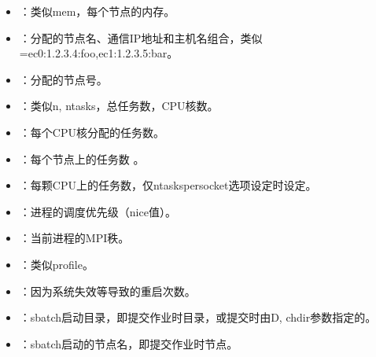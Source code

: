 \documentclass[a4paper,12pt,english]{sphinxmanual}
\begin{document}
\begin{itemize}
\item {} 
\sphinxAtStartPar
{}：类似\sphinxhyphen{}\sphinxhyphen{}mem，每个节点的内存。

\item {} 
\sphinxAtStartPar
{}：分配的节点名、通信IP地址和主机名组合，类似 =ec0:1.2.3.4:foo,ec1:1.2.3.5:bar。

\item {} 
\sphinxAtStartPar
{}：分配的节点号。

\item {} 
\sphinxAtStartPar
{}：类似\sphinxhyphen{}n, \sphinxhyphen{}\sphinxhyphen{}ntasks，总任务数，CPU核数。

\item {} 
\sphinxAtStartPar
{}：每个CPU核分配的任务数。

\item {} 
\sphinxAtStartPar
{}：每个节点上的任务数 。

\item {} 
\sphinxAtStartPar
{}：每颗CPU上的任务数，仅\sphinxhyphen{}\sphinxhyphen{}ntasks\sphinxhyphen{}per\sphinxhyphen{}socket选项设定时设定。

\item {} 
\sphinxAtStartPar
{}：进程的调度优先级（nice值）。

\item {} 
\sphinxAtStartPar
{}：当前进程的MPI秩。

\item {} 
\sphinxAtStartPar
{}：类似\sphinxhyphen{}\sphinxhyphen{}profile。

\item {} 
\sphinxAtStartPar
{}：因为系统失效等导致的重启次数。

\item {} 
\sphinxAtStartPar
{}：sbatch启动目录，即提交作业时目录，或提交时由\sphinxhyphen{}D, \sphinxhyphen{}\sphinxhyphen{}chdir参数指定的。

\item {} 
\sphinxAtStartPar
{}：sbatch启动的节点名，即提交作业时节点。


\end{itemize}
\end{document}
